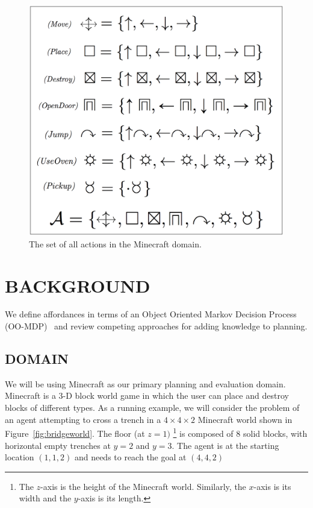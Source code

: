 \documentclass[]{article}
\begin{document}
\begin{figure}
\centering
\includegraphics[scale = 0.15]{figures/all_actions.png}
\caption{The set of all actions in the Minecraft domain. \label{fig:all_actions}}
\end{figure}

\section{BACKGROUND}

We define affordances in terms of an Object Oriented Markov Decision
Process (OO-MDP)~\citep{diuk08} and review competing approaches for
adding knowledge to planning.

\subsection{DOMAIN}

We will be using Minecraft as our primary planning and evaluation domain. Minecraft
is a 3-D block world game in which the user can place and destroy blocks of
different types. As a running example, we will consider the problem of an agent
attempting to cross a trench in a $4 \times 4 \times 2$ Minecraft world shown
in Figure~\ref{fig:bridgeworld}. The floor (at $z = 1)$ \footnote{The $z$-axis
is the height of the Minecraft world. Similarly, the $x$-axis is its width and the
$y$-axis is its length.} is composed of 8 solid blocks, with horizontal empty
trenches at $y = 2$ and $y = 3$. The agent is  at the starting location
$(1, 1, 2)$ and needs to reach the goal at $(4,4,2)$
\end{document}
